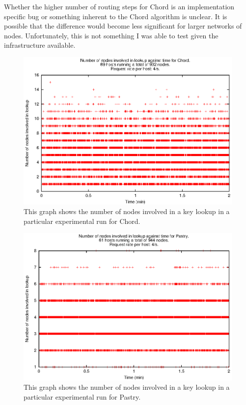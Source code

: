 Whether the higher number of routing steps for Chord is an implementation specific bug or something inherent to the Chord algorithm is unclear. It is possible that the difference would become less significant for larger networks of nodes. Unfortunately, this is not something I was able to test given the infrastructure available.

\begin{figure}[!htbp]
  \begin{center}
    \includegraphics[width=0.9\linewidth]{illustrations/nodes_against_time_chord.eps}
    \caption{This graph shows the number of nodes involved in a key lookup in a particular experimental run for Chord.}
    \label{figChordNumNodes}
  \end{center}
\end{figure}

\begin{figure}[!htbp]
  \begin{center}
    \includegraphics[width=0.9\linewidth]{illustrations/nodes_against_time_pastry.eps}
    \caption{This graph shows the number of nodes involved in a key lookup in a particular experimental run for Pastry.}
    \label{figPastryNumNodes}
  \end{center}
\end{figure}

